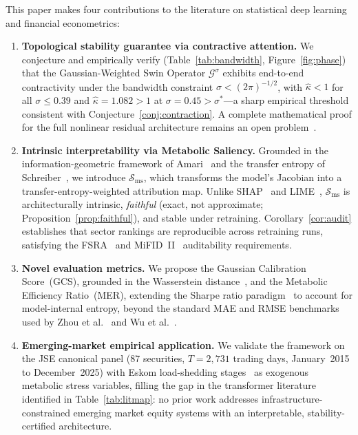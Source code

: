 \documentclass[11pt,a4paper]{article}  %
\newcommand{\Gop}{\mathcal{G}^{\sigma}}
\newcommand{\Ssal}{\mathcal{S}_{\mathrm{ms}}}
\theoremstyle{plain}
\theoremstyle{definition}
\theoremstyle{remark}
\begin{document}
This paper makes four contributions to the literature on statistical
deep learning and financial econometrics:

\begin{enumerate}[label=(\roman*),leftmargin=2em]
\item \textbf{Topological stability guarantee via contractive attention.}
  We conjecture and empirically verify (Table~\ref{tab:bandwidth},
  Figure~\ref{fig:phase}) that the Gaussian-Weighted Swin Operator
  $\Gop$ exhibits end-to-end contractivity under the bandwidth
  constraint $\sigma < (2\pi)^{-1/2}$, with $\hat{\kappa} < 1$
  for all $\sigma \leq 0.39$ and $\hat{\kappa} = 1.082 > 1$ at
  $\sigma = 0.45 > \sigma^*$---a sharp empirical threshold
  consistent with Conjecture~\ref{conj:contraction}. A complete mathematical proof for the full nonlinear
  residual architecture remains an open problem~\cite{Vuckovic2020}.

\item \textbf{Intrinsic interpretability via Metabolic Saliency.}
  Grounded in the information-geometric framework of
  Amari~\cite{Amari2016} and the transfer entropy of
  Schreiber~\cite{Schreiber2000}, we introduce $\Ssal$, which
  transforms the model's Jacobian into a transfer-entropy-weighted
  attribution map. Unlike SHAP~\cite{Lundberg2017} and
  LIME~\cite{Ribeiro2016}, $\Ssal$ is architecturally intrinsic, \emph{faithful}
  (exact, not approximate; Proposition~\ref{prop:faithful}),
  and stable under retraining. Corollary~\ref{cor:audit}
  establishes that sector rankings are reproducible across
  retraining runs, satisfying the FSRA~\cite{FSRA2017} and
  MiFID~II~\cite{MiFID2014} auditability requirements.

\item \textbf{Novel evaluation metrics.} We propose the Gaussian
  Calibration Score~(GCS), grounded in the Wasserstein
  distance~\cite{Villani2009}, and the Metabolic Efficiency
  Ratio~(MER), extending the Sharpe ratio paradigm~\cite{McNeil2015}
  to account for model-internal entropy, beyond the standard MAE
  and RMSE benchmarks used by Zhou et al.~\cite{Zhou2021} and
  Wu et al.~\cite{Wu2021}.

\item \textbf{Emerging-market empirical application.} We validate
  the framework on the JSE canonical panel (87 securities,
  $T = 2{,}731$ trading days, January~2015 to December~2025) with
  Eskom load-shedding stages~\cite{Eberhard2017} as exogenous
  metabolic stress variables, filling the gap in the transformer
  literature identified in Table~\ref{tab:litmap}: no prior work
  addresses infrastructure-constrained emerging market equity
  systems with an interpretable, stability-certified architecture.
\end{enumerate}
\end{document}
